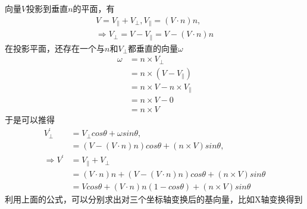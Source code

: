 \par
向量$V$投影到垂直$n$的平面，有
\begin{equation*}
    \begin{split}
        V = V_{\parallel} + V_{\perp},
        V_{\parallel} = (V \cdot n)n, \\
        \Rightarrow V_{\perp} = V - V_{\parallel} = V - (V \cdot n)n
    \end{split} 
\end{equation*}
在投影平面，还存在一个与$n$和$V_{\perp}$都垂直的向量$\omega$
\begin{equation*}
    \begin{split}
        \omega &= n \times V_{\perp} \\
        &= n \times (V - V_{\parallel}) \\
        &= n \times V - n \times V_{\parallel} \\
        &= n \times V - 0 \\
        &= n \times V
    \end{split}
\end{equation*}
于是可以推得
\begin{equation*}
    \begin{split}
        V_{\perp}^{'} &= V_{\perp}cos\theta + \omega sin\theta, \\
        &= (V - (V \cdot n)n)cos\theta + (n \times V)sin\theta, \\
        \Rightarrow V^{'} &= V_{\parallel} + V_{\perp} \\
        &= (V \cdot n)n + (V - (V \cdot n)n)cos\theta + (n \times V)sin\theta \\
        &= Vcos\theta + (V \cdot n)n(1 - cos\theta) + (n \times V)sin\theta
    \end{split} 
\end{equation*}
利用上面的公式，可以分别求出对三个坐标轴变换后的基向量，比如X轴变换得到
